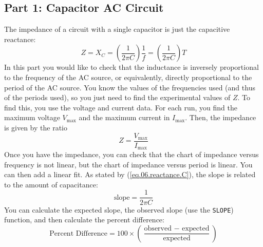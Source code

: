 \subsection{Part 1: Capacitor AC Circuit}
%
The impedance of a circuit with a single capacitor is just the capacitive reactance:
\begin{equation}
	Z = X_{C} = \left(\frac{1}{2 \pi C}\right) \frac{1}{f} = \left(\frac{1}{2 \pi C}\right) T
\end{equation}
In this part you would like to check that the inductance is inversely proportional to the frequency of the AC source, or equivalently, directly proportional to the period of the AC source. You know the values of the frequencies used (and thus of the periods used), so you just need to find the experimental values of $Z$. To find this, you use the voltage and current data. For each run, you find the maximum voltage $V_{\text{max}}$ and the maximum current in $I_{\text{max}}$. Then, the impedance is given by the ratio
\begin{equation}
	Z = \frac{V_{\text{max}}}{I_{\text{max}}}
\end{equation}
Once you have the impedance, you can check that the chart of impedance versus frequency is not linear, but the chart of impedance versus period is linear. You can then add a linear fit. As stated by (\ref{eq.06.reactance.C}), the slope is related to the amount of capacitance:
\begin{equation}
	\text{slope} = \frac{1}{2 \pi C}
\end{equation}
You can calculate the expected slope, the observed slope (use the \texttt{SLOPE}) function, and then calculate the percent difference:
\begin{equation}
	\text{Percent Difference} = 100 \times \left( \frac{\text{observed } - \text{ expected}}{\text{expected}} \right)
\end{equation}
%
